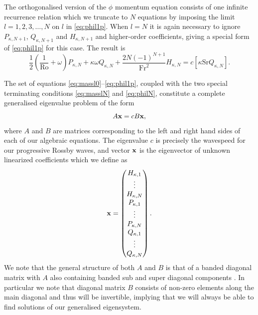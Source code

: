 The orthogonalised version of the $\phi$ momentum equation consists of one infinite recurrence relation which we truncate to $N$ equations by imposing the limit $l=1,2,3,\ldots,N$ on $l$ in \eqref{eq:phil1p}. When $l=N$ it is again necessary to ignore $P_{\kappa,N+1}$, $Q_{\kappa,N+1}$ and $H_{\kappa,N+1}$ and higher-order coefficients, giving a special form of \eqref{eq:phil1p} for this case. The result is
\begin{equation}
\frac{1}{2}\left(\frac{1}{\mathrm{Ro}}+\omega \right)P_{\kappa,N}+\kappa \omega Q_{\kappa,N} + \frac{2N(-1)^{N+1}}{\mathrm{Fr}^2} H_{\kappa,N}=c\left[\kappa \mathrm{Sr} Q_{\kappa,N}\right]. \label{eq:philN}
\end{equation}

The set of equations \eqref{eq:massl0}--\eqref{eq:phil1p}, coupled with the two special terminating conditions \eqref{eq:masslN} and \eqref{eq:philN}, constitute a complete generalised eigenvalue problem of the form
\begin{equation*}
A \mathbf{x}=cB\mathbf{x},
\end{equation*}
where $A$ and $B$ are matrices corresponding to the left and right hand sides of each of our algebraic equations. The eigenvalue $c$ is precisely the wavespeed for our progressive Rossby waves, and vector $\mathbf{x}$ is the eigenvector of unknown linearized coefficients which we define as
\begin{equation}
\mathbf{x}=\begin{pmatrix}  H_{\kappa,1} \\ \vdots \\ H_{\kappa,N} \\P_{\kappa,1} \\ \vdots \\ P_{\kappa,N} \\ Q_{\kappa,1} \\ \vdots \\ Q_{\kappa,N}
\end{pmatrix}.
\end{equation}
We note that the general structure of both $A$ and $B$ is that of a banded diagonal matrix with $A$ also containing banded sub and super diagonal components . In particular we note that diagonal matrix $B$ consists of non-zero elements along the main diagonal and thus will be invertible, implying that we will always be able to find solutions of our generalised eigensystem. 

